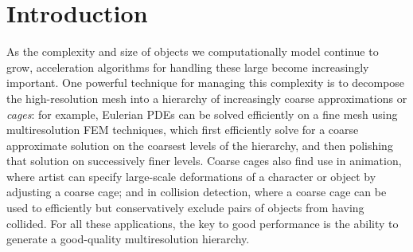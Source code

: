 \section{Introduction}
\label{sec:introduction}


As the complexity and size of objects we computationally model continue to
grow, acceleration algorithms for handling these large become
increasingly important. One powerful technique for managing this complexity is to decompose the
high-resolution mesh into a hierarchy of increasingly coarse approximations or
\emph{cages}: for example, Eulerian PDEs can be solved efficiently on a fine
mesh using multiresolution FEM techniques, which
first efficiently solve for a coarse approximate solution on the coarsest levels of the
hierarchy, and then polishing that solution on successively finer levels.
Coarse cages also find use in animation, where artist can specify large-scale deformations of
a character or object by adjusting a coarse cage; and in collision detection, where
a coarse cage can be used to efficiently but conservatively exclude pairs of
objects from having collided. For all these applications, the key to good
performance is the ability to generate a good-quality multiresolution
hierarchy.

